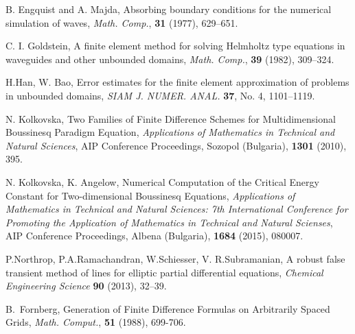\documentclass[12pt]{article}
\theoremstyle{theorem}
\theoremstyle{defi}
\begin{document}
\begin{thebibliography}{99}
 B. Engquist and A. Majda, Absorbing boundary conditions for the numerical simulation of waves, {\it Math. Comp.}, \textbf{31} (1977), 629–651.

  C. I. Goldstein, A finite element method for solving Helmholtz type equations in waveguides and other unbounded domains, 
{\it Math. Comp.}, \textbf{39} (1982), 309–324.

  H.Han, W. Bao, Error estimates for the finite element approximation of problems in unbounded domains, 
{\it SIAM J. NUMER. ANAL.} \textbf{37}, No. 4, 1101–1119.

 N. Kolkovska, Two Families of Finite Difference Schemes for Multidimensional Boussinesq Paradigm Equation, 
{\it Applications of Mathematics in Technical and Natural Sciences},
AIP Conference Proceedings, Sozopol (Bulgaria), \textbf{1301} (2010), 395.

 N. Kolkovska, K. Angelow, Numerical Computation of the Critical Energy Constant for Two-dimensional Boussinesq Equations,  
{\it Applications of Mathematics in Technical and Natural Sciences: 7th International Conference for Promoting the Application of Mathematics in Technical and Natural Scienses},
AIP Conference Proceedings, Albena (Bulgaria), \textbf{1684} (2015), 080007.

 P.Northrop, P.A.Ramachandran, W.Schiesser, V. R.Subramanian, A robust false transient method of lines for elliptic partial differential equations, 
{\it Chemical Engineering Science} \textbf{90} (2013), 32–39.

B.~Fornberg, Generation of Finite Difference Formulas on Arbitrarily Spaced Grids, {\it  Math. Comput.}, \textbf{51} (1988), 699-706.
\end{thebibliography}
\end{document}
